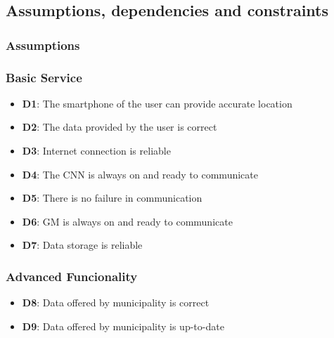 \subsection{Assumptions, dependencies and constraints}

\subsubsection{Assumptions}

\subsubsection*{Basic Service}

\begin{itemize}

\item \textbf{D1}: The smartphone of the user can provide accurate location

\item \textbf{D2}: The data provided by the user is correct

\item \textbf{D3}: Internet connection is reliable

\item \textbf{D4}: The CNN is always on and ready to communicate

\item \textbf{D5}: There is no failure in communication

\item \textbf{D6}: GM is always on and ready to communicate

\item \textbf{D7}: Data storage is reliable

\end{itemize}

\subsubsection*{Advanced Funcionality}

\begin{itemize}

\item \textbf{D8}: Data offered by municipality is correct

\item \textbf{D9}: Data offered by municipality is up-to-date

\end{itemize}

